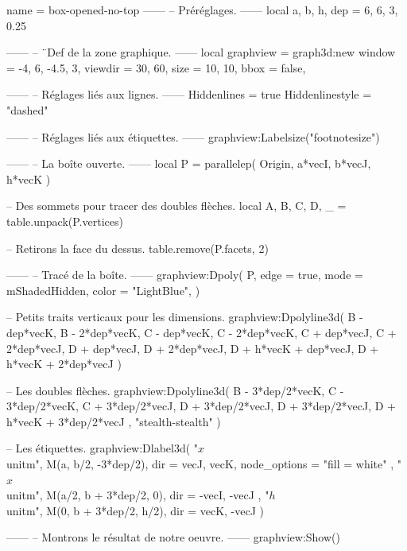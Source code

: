 \documentclass[border = 3pt]{standalone}
\begin{document}
\begin{luadraw*}{name = box-opened-no-top}
------
-- Préréglages.
------
local a, b, h, dep = 6, 6, 3, 0.25

------
-- ¨Def de la zone graphique.
------
local graphview = graph3d:new{
  window  = {-4, 6, -4.5, 3},
  viewdir = {30, 60},
  size    = {10, 10},
  bbox    = false,
}

------
-- Réglages liés aux lignes.
------
Hiddenlines     = true
Hiddenlinestyle = "dashed"

------
-- Réglages liés aux étiquettes.
------
graphview:Labelsize("footnotesize")

------
-- La boîte ouverte.
------
local P = parallelep(
  Origin,
  a*vecI, b*vecJ, h*vecK
)

-- Des sommets pour tracer des doubles flèches.
local A, B, C, D, _  = table.unpack(P.vertices)

-- Retirons la face du dessus.
table.remove(P.facets, 2)

------
-- Tracé de la boîte.
------
graphview:Dpoly(
  P,
  {
    edge  = true,
    mode  = mShadedHidden,
    color = "LightBlue",
  }
)

-- Petits traits verticaux pour les dimensions.
graphview:Dpolyline3d(
{
  {B - dep*vecK, B - 2*dep*vecK},
  {C - dep*vecK, C - 2*dep*vecK},
  {C + dep*vecJ, C + 2*dep*vecJ},
  {D + dep*vecJ, D + 2*dep*vecJ},
  {D + h*vecK + dep*vecJ, D + h*vecK + 2*dep*vecJ}
}
)

-- Les doubles flèches.
graphview:Dpolyline3d(
{
  {B - 3*dep/2*vecK, C - 3*dep/2*vecK},
  {C + 3*dep/2*vecJ, D + 3*dep/2*vecJ},
  {D + 3*dep/2*vecJ, D + h*vecK + 3*dep/2*vecJ}
},
"stealth-stealth"
)

-- Les étiquettes.
graphview:Dlabel3d(
  "$x$ \\unit{m}", M(a, b/2, -3*dep/2),
  {
    dir          = {vecJ, vecK},
    node_options = "fill = white"
  },
  "$x$ \\unit{m}", M(a/2, b + 3*dep/2, 0),
  {
    dir = {-vecI, -vecJ}
  },
  "$h$ \\unit{m}", M(0, b + 3*dep/2, h/2),
  {
    dir = {vecK, -vecJ}
  }
)

------
-- Montrons le résultat de notre oeuvre.
------
graphview:Show()
\end{luadraw*}
\end{document}
